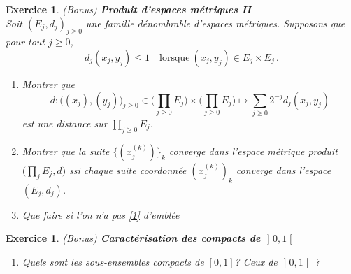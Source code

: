 \documentclass[11pt,a4paper]{article}
\newcommand{\parent}[1]{\bigl(#1\bigr)}
\newcommand{\set}[1]{\bigl\{#1\mathclose{}\bigr\}}
\newcommand{\interval}[4]{\mathopen{#1}#2\mathclose{}\mathpunct{},#3\mathclose{#4}}
\newcommand{\intervaloo}[2]{\interval{]}{#1}{#2}{[}}
\newcounter{ex}
\newtheorem{exs}[ex]{Exercice}
\newenvironment{exo}{\begin{exs}\rm}{\end{exs}\vspace{.1cm}}
\begin{document}
\begin{exo}\textit{(Bonus)} \textbf{Produit d'espaces métriques II}\\

Soit $(E_j,d_j)_{j\geq0}$ une famille dénombrable d'espaces métriques. Supposons que pour tout $j\geq0$,
\begin{equation} \label{1}
d_j(x_j,y_j)\leq1\quad \text{lorsque}\ (x_j,y_j)\in E_j\times E_j\,.
\end{equation}
\begin{enumerate}
    \item Montrer que 
    \[
    d: \parent{(x_j),(y_j)}_{j\geq0}\in  \parent{\prod_{j\geq0}E_j}\times\parent{\prod_{j\geq0}E_j}\longmapsto \sum_{j\geq0}2^{-j}d_j(x_j,y_j)
    \]
est une distance sur $\displaystyle\prod_{j\geq0}E_j$. 
\item Montrer que la suite $\set{(x_j^{(k)})}_k$ converge dans l'espace métrique produit $\parent{\prod_j E_j, d}$ \textit{ssi} chaque suite coordonnée $(x_j^{(k)})_k$ converge dans l'espace $(E_j,d_j)$.
\item
Que faire si l'on n'a pas \eqref{1} d'embl\'ee
\end{enumerate}
\end{exo}

\begin{exo} \textit{(Bonus)} \textbf{Caractérisation des compacts de $\intervaloo{0}{1}$} \\
\begin{enumerate}
    \item Quels sont les sous-ensembles compacts de 
    $[0,1]$? Ceux de $\intervaloo{0}{1}$ ? 
\end{enumerate}

\end{exo}
\end{document}

